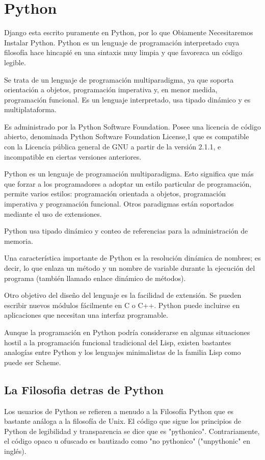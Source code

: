 \section{Python}

Django esta escrito puramente en Python, por lo que Obiamente Necesitaremos Instalar
Python. Python es un lenguaje de programación interpretado cuya filosofía hace
 hincapié en una sintaxis muy limpia y que favorezca un código legible.
 
Se trata de un lenguaje de programación multiparadigma, ya que soporta
orientación a objetos, programación imperativa y, en menor medida, programación
funcional. Es un lenguaje interpretado, usa tipado dinámico y es multiplataforma.

Es administrado por la Python Software Foundation. Posee una licencia de código
abierto, denominada Python Software Foundation License,1 que es compatible con
la Licencia pública general de GNU a partir de la versión 2.1.1, e
incompatible en ciertas versiones anteriores.

Python es un lenguaje de programación multiparadigma. Esto significa que más
que forzar a los programadores a adoptar un estilo particular de programación,
permite varios estilos: programación orientada a objetos, programación imperativa
y programación funcional. Otros paradigmas están soportados mediante el uso
de extensiones.

Python usa tipado dinámico y conteo de referencias para la administración
de memoria.

Una característica importante de Python es la resolución dinámica de nombres;
 es decir, lo que enlaza un método y un nombre de variable durante la ejecución
  del programa (también llamado enlace dinámico de métodos).
  
Otro objetivo del diseño del lenguaje es la facilidad de extensión. Se pueden
escribir nuevos módulos fácilmente en C o C++. Python puede incluirse en
aplicaciones que necesitan una interfaz programable.

Aunque la programación en Python podría considerarse en algunas situaciones
hostil a la programación funcional tradicional del Lisp, existen bastantes
analogías entre Python y los lenguajes minimalistas de la familia Lisp como
puede ser Scheme.

\subsection{La Filosofia detras de Python}
Los usuarios de Python se refieren a menudo a la Filosofía Python que es bastante
análoga a la filosofía de Unix. El código que sigue los principios de Python de
legibilidad y transparencia se dice que es "pythonico". Contrariamente, el
código opaco u ofuscado es bautizado como "no pythonico" ("unpythonic" en inglés).

